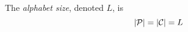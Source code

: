\begin{definition}\label{def:Alphabet_Size}
  The \emph{alphabet size}, denoted $L$, is
  \begin{equation}\label{eq:Alphabet_Size}
    \lvert \operatorname{\mathcal{P}} \rvert = \lvert \operatorname{\mathcal{C}} \rvert = L
  \end{equation}
\end{definition}

